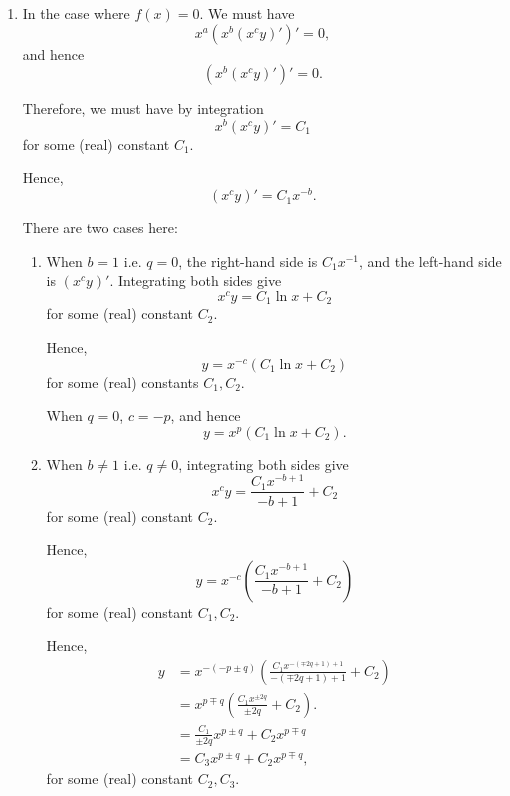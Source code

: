 \begin{enumerate}
    \item In the case where \(f(x) = 0\). We must have
          \[
              x^{a} \left(x^{b} (x^{c} y)'\right)' = 0,
          \]
          and hence
          \[
              \left(x^{b} (x^{c} y)'\right)' = 0.
          \]

          Therefore, we must have by integration
          \[
              x^{b} (x^{c} y)' = C_1
          \]
          for some (real) constant \(C_1\).

          Hence,
          \[
              (x^{c} y)' = C_1 x^{-b}.
          \]

          There are two cases here:
          \begin{enumerate}
              \item When \(b = 1\) i.e. \(q = 0\), the right-hand side is \(C_1 x^{-1}\), and the left-hand side is \((x^{c} y)'\). Integrating both sides give
                    \[
                        x^{c} y = C_1 \ln x + C_2
                    \]
                    for some (real) constant \(C_2\).

                    Hence,
                    \[
                        y = x^{-c} (C_1 \ln x + C_2)
                    \]
                    for some (real) constants \(C_1, C_2\).

                    When \(q = 0\), \(c = -p\), and hence
                    \[
                        y = x^p (C_1 \ln x + C_2).
                    \]

              \item When \(b \neq 1\) i.e. \(q \neq 0\), integrating both sides give
                    \[
                        x^{c} y = \frac{C_1 x^{-b + 1}}{-b + 1} + C_2
                    \]
                    for some (real) constant \(C_2\).

                    Hence,
                    \[
                        y = x^{-c} \left(\frac{C_1 x^{-b + 1}}{-b + 1} + C_2\right)
                    \]
                    for some (real) constant \(C_1, C_2\).

                    Hence,
                    \begin{align*}
                        y & = x^{-(-p \pm q)} \left(\frac{C_1 x^{-(\mp 2q + 1) + 1}}{-(\mp 2q + 1) + 1} + C_2\right) \\
                          & = x^{p \mp q} \left(\frac{C_1 x^{\pm 2q}}{\pm 2q} + C_2\right).                          \\
                          & = \frac{C_1}{\pm 2q} x^{p \pm q} + C_2 x^{p \mp q}                                       \\
                          & = C_3 x^{p \pm q} + C_2 x^{p \mp q},
                    \end{align*}
                    for some (real) constant \(C_2, C_3\).
          \end{enumerate}


\end{enumerate}
